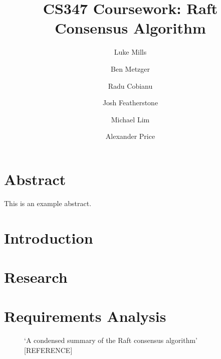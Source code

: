 \documentclass{article}
\title{CS347 Coursework: Raft Consensus Algorithm}
\author{Luke Mills \and Ben Metzger \and Radu Cobianu \and Josh Featherstone \and Michael Lim \and Alexander Price}
\begin{document}
\maketitle

\section{Abstract}

This is an example abstract.

\section{Introduction}

\section{Research}

\section{Requirements Analysis}

    \begin{figure}[H]
        \centering
        \caption{`A condensed summary of the Raft consensus algorithm' [REFERENCE] }
        \label{fig:condensedsummary}
    \end{figure}
    
\end{document}
